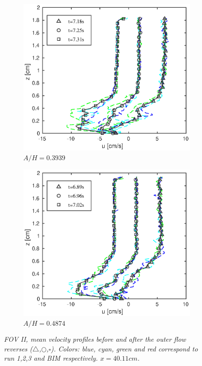 \documentclass[review]{elsarticle}
\begin{document}
\begin{figure}[]
{\begin{subfigure}[b]{.3\textwidth}
\centering
\includegraphics[width=.95\textwidth]{./Figures/FOV_4/case40_sept2015.eps}
\caption{\textit{$A/H=0.3939$}}
\end{subfigure}%
\begin{subfigure}[b]{.3\textwidth}
\centering
\includegraphics[width=.95\textwidth]{./Figures/FOV_4/case50_sept2015.eps}
\caption{\textit{$A/H=0.4874$}}
\end{subfigure}%
}
\caption{ \textit{FOV II, mean velocity profiles before  and after the outer flow reverses ($\triangle$,$\bigcirc$,$\square$). Colors: blue, cyan, green and red correspond to run 1,2,3 and BIM respectively.  $x=40.11cm$. } }
\label{fig:PIV_FOV4}
\end{figure}
\end{document}

